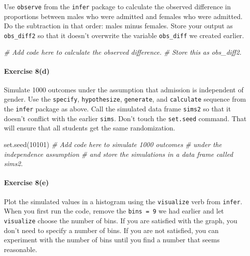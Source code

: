 \documentclass[
]{book}
\newenvironment{Shaded}{\begin{snugshade}}{\end{snugshade}}
\newcommand{\CommentTok}[1]{\textcolor[rgb]{0.56,0.35,0.01}{\textit{#1}}}
\newcommand{\DecValTok}[1]{\textcolor[rgb]{0.00,0.00,0.81}{#1}}
\newcommand{\FunctionTok}[1]{\textcolor[rgb]{0.00,0.00,0.00}{#1}}
\newcommand{\NormalTok}[1]{#1}
\begin{document}
Use \texttt{observe} from the \texttt{infer} package to calculate the observed difference in proportions between males who were admitted and females who were admitted. Do the subtraction in that order: males minus females. Store your output as \texttt{obs\_diff2} so that it doesn't overwrite the variable \texttt{obs\_diff} we created earlier.

\begin{Shaded}
\begin{Highlighting}[]
\CommentTok{\# Add code here to calculate the observed difference.}
\CommentTok{\# Store this as obs\_diff2.}
\end{Highlighting}
\end{Shaded}

\hypertarget{exercise-8d}{%
\paragraph*{Exercise 8(d)}\label{exercise-8d}}

Simulate 1000 outcomes under the assumption that admission is independent of gender. Use the \texttt{specify}, \texttt{hypothesize}, \texttt{generate}, and \texttt{calculate} sequence from the \texttt{infer} package as above. Call the simulated data frame \texttt{sims2} so that it doesn't conflict with the earlier \texttt{sims}. Don't touch the \texttt{set.seed} command. That will ensure that all students get the same randomization.

\begin{Shaded}
\begin{Highlighting}[]
\FunctionTok{set.seed}\NormalTok{(}\DecValTok{10101}\NormalTok{)}
\CommentTok{\# Add code here to simulate 1000 outcomes}
\CommentTok{\# under the independence assumption}
\CommentTok{\# and store the simulations in a data frame called sims2.}
\end{Highlighting}
\end{Shaded}

\hypertarget{exercise-8e}{%
\paragraph*{Exercise 8(e)}\label{exercise-8e}}

Plot the simulated values in a histogram using the \texttt{visualize} verb from \texttt{infer}. When you first run the code, remove the \texttt{bins\ =\ 9} we had earlier and let \texttt{visualize} choose the number of bins. If you are satisfied with the graph, you don't need to specify a number of bins. If you are not satisfied, you can experiment with the number of bins until you find a number that seems reasonable.
\end{document}
